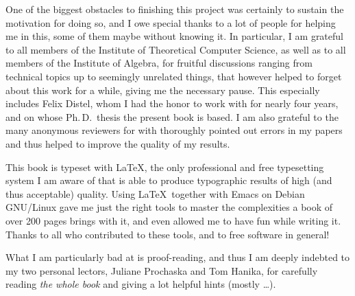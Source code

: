 One of the biggest obstacles to finishing this project was certainly to sustain the
motivation for doing so, and I owe special thanks to a lot of people for helping me in
this, some of them maybe without knowing it.  In particular, I am grateful to all members
of the Institute of Theoretical Computer Science, as well as to all members of the
Institute of Algebra, for fruitful discussions ranging from technical topics up to
seemingly unrelated things, that however helped to forget about this work for a while,
giving me the necessary pause.  This especially includes Felix Distel, whom I had the
honor to work with for nearly four years, and on whose Ph.\,D.\, thesis the present book
is based.  I am also grateful to the many anonymous reviewers for with thoroughly pointed
out errors in my papers and thus helped to improve the quality of my results.

This book is typeset with \LaTeX, the only professional and free typesetting system I am
aware of that is able to produce typographic results of high (and thus acceptable)
quality.  Using \LaTeX\ together with Emacs on Debian GNU/Linux gave me just the right
tools to master the complexities a book of over 200 pages brings with it, and even allowed
me to have fun while writing it.  Thanks to all who contributed to these tools, and to
free software in general!

What I am particularly bad at is proof-reading, and thus I am deeply indebted to my two
personal lectors, Juliane Prochaska and Tom Hanika, for carefully reading \emph{the whole
  book} and giving a lot helpful hints (mostly \dots).  

~


